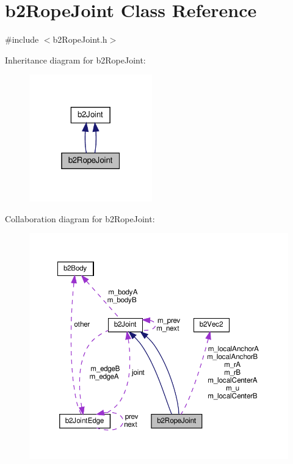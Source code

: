 \hypertarget{classb2RopeJoint}{}\section{b2\+Rope\+Joint Class Reference}
\label{classb2RopeJoint}


{\ttfamily \#include $<$b2\+Rope\+Joint.\+h$>$}



Inheritance diagram for b2\+Rope\+Joint\+:
\nopagebreak
\begin{figure}[H]
\begin{center}
\leavevmode
\includegraphics[width=151pt]{classb2RopeJoint__inherit__graph}
\end{center}
\end{figure}


Collaboration diagram for b2\+Rope\+Joint\+:
\nopagebreak
\begin{figure}[H]
\begin{center}
\leavevmode
\includegraphics[width=350pt]{classb2RopeJoint__coll__graph}
\end{center}
\end{figure}
